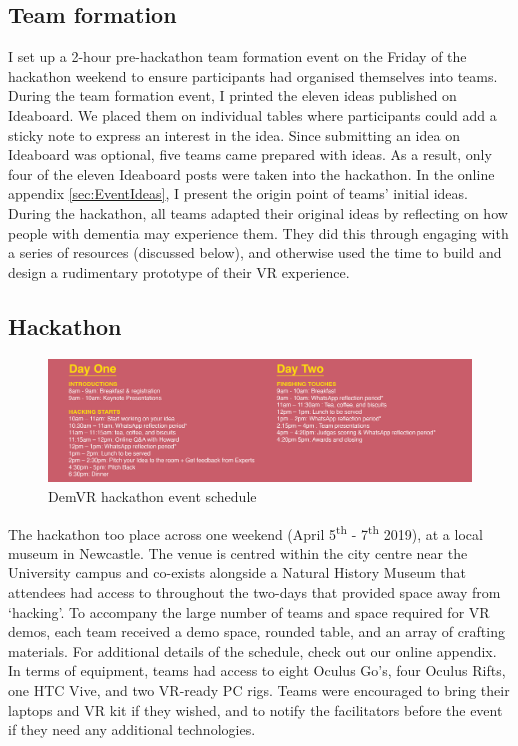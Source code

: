 \subsection{Team formation}
\label{sec:TeamFormation}
I set up a 2-hour pre-hackathon team formation event on the Friday of the hackathon weekend to ensure participants had organised themselves into teams. During the team formation event, I printed the eleven ideas published on Ideaboard. We placed them on individual tables where participants could add a sticky note to express an interest in the idea. Since submitting an idea on Ideaboard was optional, five teams came prepared with ideas. As a result, only four of the eleven Ideaboard posts were taken into the hackathon. In the online appendix \ref{sec:EventIdeas}, I present the origin point of teams’ initial ideas. During the hackathon, all teams adapted their original ideas by reflecting on how people with dementia may experience them. They did this through engaging with a series of resources (discussed below), and otherwise used the time to build and design a rudimentary prototype of their VR experience. 

\subsection{Hackathon}
\label{sec:HackathonEvent}
\begin{figure}[htp]
\centering
\includegraphics[width=1\linewidth]{Images/DemVR/DemVRHackathonSchedule.png}
\caption{DemVR hackathon event schedule}
\label{fig:schedule}
\end{figure}
The hackathon too place across one weekend (April 5\textsuperscript{th} - 7\textsuperscript{th} 2019), at a local museum in Newcastle. The venue is centred within the city centre near the University campus and co-exists alongside a Natural History Museum that attendees had access to throughout the two-days that provided space away from ‘hacking’. To accompany the large number of teams and space required for VR demos, each team received a demo space, rounded table, and an array of crafting materials. For additional details of the schedule, check out our online appendix. In terms of equipment, teams had access to eight Oculus Go’s, four Oculus Rifts, one HTC Vive, and two VR-ready PC rigs. Teams were encouraged to bring their laptops and VR kit if they wished, and to notify the facilitators before the event if they need any additional technologies.

